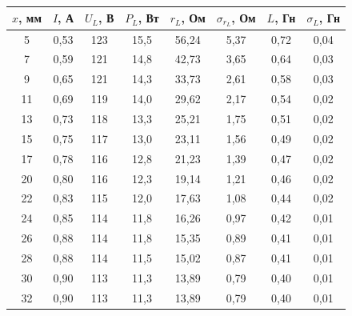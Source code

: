 \documentclass[a4paper,12pt]{article} %
\begin{document}
\begin{table}[H]
	\centering
	\begin{tabular}{|c|c|c|c|c|c|c|c|}
		\hline
		$ x $, мм & $ I $, А & $ U_L $, В & $ P_L $, Вт & $ r_L $, Ом & $\sigma_{{r_L}}$,   Ом & $ L $, Гн & $\sigma_L$, Гн \\ \hline
		5         & 0,53     & 123        & 15,5        & 56,24       & 5,37                   & 0,72      & 0,04           \\ \hline
		7         & 0,59     & 121        & 14,8        & 42,73       & 3,65                   & 0,64      & 0,03           \\ \hline
		9         & 0,65     & 121        & 14,3        & 33,73       & 2,61                   & 0,58      & 0,03           \\ \hline
		11        & 0,69     & 119        & 14,0        & 29,62       & 2,17                   & 0,54      & 0,02           \\ \hline
		13        & 0,73     & 118        & 13,3        & 25,21       & 1,75                   & 0,51      & 0,02           \\ \hline
		15        & 0,75     & 117        & 13,0        & 23,11       & 1,56                   & 0,49      & 0,02           \\ \hline
		17        & 0,78     & 116        & 12,8        & 21,23       & 1,39                   & 0,47      & 0,02           \\ \hline
		20        & 0,80     & 116        & 12,3        & 19,14       & 1,21                   & 0,46      & 0,02           \\ \hline
		22        & 0,83     & 115        & 12,0        & 17,63       & 1,08                   & 0,44      & 0,02           \\ \hline
		24        & 0,85     & 114        & 11,8        & 16,26       & 0,97                   & 0,42      & 0,01           \\ \hline
		26        & 0,88     & 114        & 11,8        & 15,35       & 0,89                   & 0,41      & 0,01           \\ \hline
		28        & 0,88     & 114        & 11,5        & 15,02       & 0,87                   & 0,41      & 0,01           \\ \hline
		30        & 0,90     & 113        & 11,3        & 13,89       & 0,79                   & 0,40      & 0,01           \\ \hline
		32        & 0,90     & 113        & 11,3        & 13,89       & 0,79                   & 0,40      & 0,01           \\ \hline

\end{tabular}
\end{table}
\end{document}
